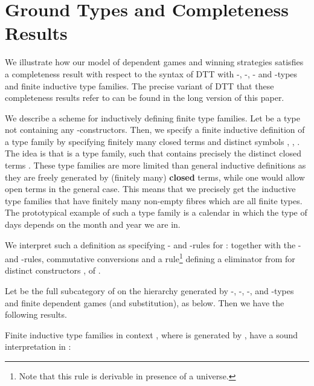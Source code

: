 \documentclass[runningheads,a4paper]{llncs}
\newcommand{\sem}[2][M\!,g]{ [\![ #2 ]\!]^{}}
\renewcommand{\emph}[1]{\textbf{#1}}
\begin{document}
\vspace{-14pt}
\section{Ground Types and Completeness Results}\label{sec:compl}
\vspace{-9pt}
We illustrate how our model of dependent games and winning strategies satisfies a completeness result with respect to the syntax of \textsf{DTT} with -, -, - and -types and finite inductive type families. The precise variant of \textsf{DTT} that these completeness results refer to can be found in the long version of this paper.

We describe a scheme for inductively defining finite type families. Let  be a type not containing any -constructors. Then, we specify a finite inductive definition of a type family  by specifying finitely many closed terms  and distinct symbols , , . The idea is that  is a type family, such that  contains precisely the distinct closed terms . These type families are more limited than general inductive definitions as they are freely generated by (finitely many) \emph{closed} terms, while one would allow open terms in the general case. This means that we precisely get the inductive type families that have finitely many non-empty fibres which are all finite types. The prototypical example of such a type family is a calendar in which the type of days depends on the month and year we are in.

We interpret such a definition as specifying - and -rules for :\vspace{4pt}\linebreak
{}
together with the - and -rules, commutative conversions and a rule\footnote{Note that this rule is derivable in presence of a universe.} defining a  eliminator from  for distinct constructors ,  of .

Let  be the full subcategory of   on the hierarchy generated by -, -, -, and -types and finite dependent games (and substitution), as below. Then we have the following results.
\begin{theorem} Finite inductive type families  in context , where  is generated by , have a sound interpretation in : \;\resizebox{0.50\linewidth}{!}{\small
\begin{diagram}
\sem{B}:
\sem{a_i}& \rMapsto & [\widetilde{\{b_{ij}\;|\; j\}_*}], \quad& 
\mathsf{else} & \rMapsto & [\widetilde{\emptyset}_*].
\end{diagram}}
\end{theorem}
\end{document}
